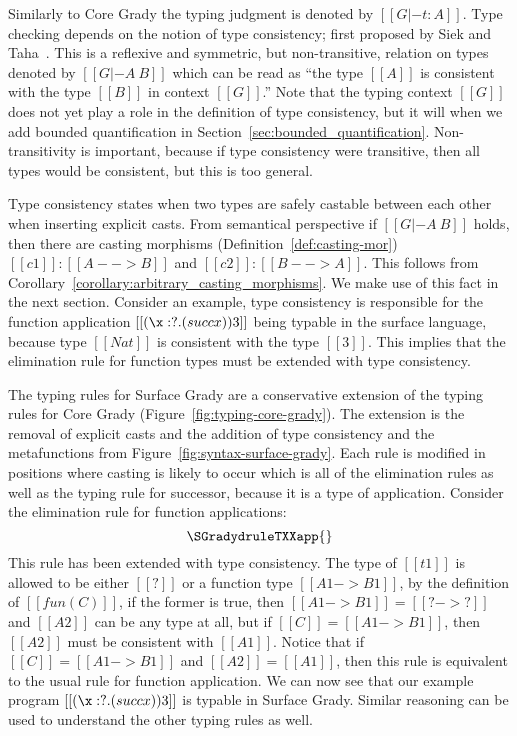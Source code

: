 Similarly to Core Grady the typing judgment is denoted by $[[G |- t :
    A]]$.  Type checking depends on the notion of type consistency;
first proposed by Siek and Taha~\cite{Siek:2006}.  This is a reflexive
and symmetric, but non-transitive, relation on types denoted by $[[G
    |- A ~ B]]$ which can be read as ``the type $[[A]]$ is consistent
with the type $[[B]]$ in context $[[G]]$.''  Note that the typing
context $[[G]]$ does not yet play a role in the definition of type
consistency, but it will when we add bounded quantification in
Section~\ref{sec:bounded_quantification}.  Non-transitivity is
important, because if type consistency were transitive, then all types
would be consistent, but this is too general.

Type consistency states when two types are safely castable between
each other when inserting explicit casts.  From semantical perspective
if $[[G |- A ~ B]]$ holds, then there are casting morphisms
(Definition~\ref{def:casting-mor}) $[[c1]] : [[A --> B]]$ and $[[c2]]
: [[B --> A]]$.  This follows from
Corollary~\ref{corollary:arbitrary_casting_morphisms}.  We make use of
this fact in the next section. Consider an example, type consistency
is responsible for the function application $[[(\x:?.(succ x)) 3]]$
being typable in the surface language, because type $[[Nat]]$ is
consistent with the type $[[3]]$.  This implies that the elimination
rule for function types must be extended with type consistency.

The typing rules for Surface Grady are a conservative extension of the
typing rules for Core Grady (Figure~\ref{fig:typing-core-grady}). The
extension is the removal of explicit casts and the addition of type
consistency and the metafunctions from
Figure~\ref{fig:syntax-surface-grady}.  Each rule is modified in
positions where casting is likely to occur which is all of the
elimination rules as well as the typing rule for successor, because it
is a type of application.  Consider the elimination rule for function
applications:
\[
\SGradydruleTXXapp{}
\]
This rule has been extended with type consistency.  The type of
$[[t1]]$ is allowed to be either $[[?]]$ or a function type $[[A1 ->
    B1]]$, by the definition of $[[fun(C)]]$, if the former is true,
then $[[A1 -> B1]] = [[? -> ?]]$ and $[[A2]]$ can be any type at all,
but if $[[C]] = [[A1 -> B1]]$, then $[[A2]]$ must be consistent with
$[[A1]]$.  Notice that if $[[C]] = [[A1 -> B1]]$ and $[[A2]] =
[[A1]]$, then this rule is equivalent to the usual rule for function
application. We can now see that our example program $[[(\x:?.(succ
    x)) 3]]$ is typable in Surface Grady.  Similar reasoning can be
used to understand the other typing rules as well.

